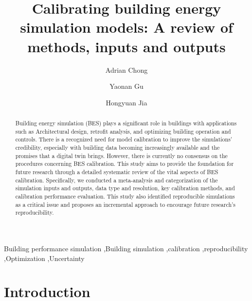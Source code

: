 \documentclass[review]{elsarticle}
\begin{document}
\begin{frontmatter}

\title{Calibrating building energy simulation models: A review of methods, inputs and outputs}


\author[add1]{Adrian Chong}
\author[add1]{Yaonan Gu}
\author[add2]{Hongyuan Jia}

\address[add1]{Department of Building, School of Design and Environment, National University of Singapore, 4 Architecture Drive, Singapore 117566, Singapore}
\address[add2]{SinBerBEST Program, Berkeley Education Alliance for Research in Singapore, Singapore, 138602, Singapore}


\begin{abstract}
Building energy simulation (BES) plays a significant role in buildings with applications such as Architectural design, retrofit analysis, and optimizing building operation and controls. There is a recognized need for model calibration to improve the simulations' credibility, especially with building data becoming increasingly available and the promises that a digital twin brings. However, there is currently no consensus on the procedures concerning BES calibration. This study aims to provide the foundation for future research through a detailed systematic review of the vital aspects of BES calibration. Specifically, we conducted a meta-analysis and categorization of the simulation inputs and outputs, data type and resolution, key calibration methods, and calibration performance evaluation. This study also identified reproducible simulations as a critical issue and proposes an incremental approach to encourage future research's reproducibility. 

\end{abstract}
\begin{keyword}
Building performance simulation \sep Building simulation \sep calibration \sep reproducibility \sep Optimization \sep Uncertainty
\end{keyword}

\end{frontmatter}


\linenumbers
\section{Introduction}
\end{document}
